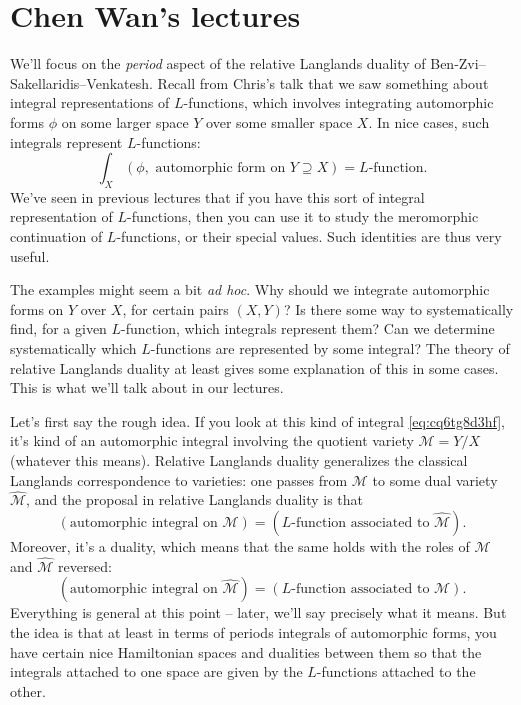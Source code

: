 \documentclass[reqno]{amsart} 
\numberwithin{theorem}{section}
\numberwithin{equation}{section}
\numberwithin{exercise}{section}
\begin{document}
\section{Chen Wan's lectures}\label{sec:cq6tho3cpy}

We'll focus on the \emph{period} aspect of the relative Langlands duality of Ben-Zvi--Sakellaridis--Venkatesh.  Recall from Chris's talk that we saw something about integral representations of $L$-functions, which involves integrating automorphic forms $\phi$ on some larger space $Y$ over some smaller space $X$.  In nice cases, such integrals represent $L$-functions:
\begin{equation}\label{eq:cq6tg8d3hf}
  \int_X (\phi, \text{ automorphic form on $Y \supseteq X$}) = \text{$L$-function}.
\end{equation}
We've seen in previous lectures that if you have this sort of integral representation of $L$-functions, then you can use it to study the meromorphic continuation of $L$-functions, or their special values.  Such identities are thus very useful.

The examples might seem a bit \emph{ad hoc}.  Why should we integrate automorphic forms on $Y$ over $X$, for certain pairs $(X, Y)$?  Is there some way to systematically find, for a given $L$-function, which integrals represent them?  Can we determine systematically which $L$-functions are represented by some integral?  The theory of relative Langlands duality at least gives some explanation of this in some cases.  This is what we'll talk about in our lectures.

Let's first say the rough idea.  If you look at this kind of integral \eqref{eq:cq6tg8d3hf}, it's kind of an automorphic integral involving the quotient variety $\mathcal{M} = Y / X$ (whatever this means).  Relative Langlands duality generalizes the classical Langlands correspondence to varieties: one passes from $\mathcal{M}$ to some dual variety $\hat{\mathcal{M}}$, and the proposal in relative Langlands duality is that
\begin{equation*}
  (\text{automorphic integral on } \mathcal{M})
  = 
  (\text{$L$-function associated to } \hat{\mathcal{M}}).
\end{equation*}
Moreover, it's a duality, which means that the same holds with the roles of $\mathcal{M}$ and $\hat{\mathcal{M}}$ reversed:
\begin{equation*}
  (\text{automorphic integral on } \hat{\mathcal{M}})
  = 
  (\text{$L$-function associated to } \mathcal{M}).
\end{equation*}
Everything is general at this point -- later, we'll say precisely what it means.  But the idea is that at least in terms of periods integrals of automorphic forms, you have certain nice Hamiltonian spaces and dualities between them so that the integrals attached to one space are given by the $L$-functions attached to the other.
\end{document}
